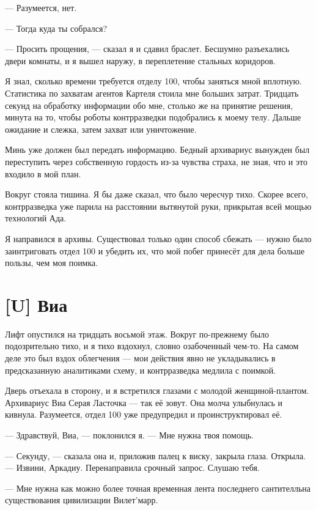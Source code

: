 --- Разумеется, нет.

--- Тогда куда ты собрался?

--- Просить прощения, --- сказал я и сдавил браслет.
Бесшумно разъехались двери комнаты, и я вышел наружу, в переплетение стальных коридоров.

\asterism

Я знал, сколько времени требуется отделу 100, чтобы заняться мной вплотную.
Статистика по захватам агентов Картеля стоила мне больших затрат.
Тридцать секунд на обработку информации обо мне, столько же на принятие решения, минута на то, чтобы роботы контрразведки подобрались к моему телу.
Дальше ожидание и слежка, затем захват или уничтожение.

Минь уже должен был передать информацию.
Бедный архивариус вынужден был переступить через собственную гордость из-за чувства страха, не зная, что и это входило в мой план.

Вокруг стояла тишина.
Я бы даже сказал, что было чересчур тихо.
Скорее всего, контрразведка уже парила на расстоянии вытянутой руки, прикрытая всей мощью технологий Ада.

Я направился в архивы.
Существовал только один способ сбежать --- нужно было заинтриговать отдел 100 и убедить их, что мой побег принесёт для дела больше пользы, чем моя поимка.


\section{[U] Виа}

Лифт опустился на тридцать восьмой этаж.
Вокруг по-прежнему было подозрительно тихо, и я тихо вздохнул, словно озабоченный чем-то.
На самом деле это был вздох облегчения --- мои действия явно не укладывались в предсказанную аналитиками схему, и контрразведка медлила с поимкой.

Дверь отъехала в сторону, и я встретился глазами с молодой женщиной-плантом.
Архивариус Виа Серая Ласточка --- так её зовут.
Она молча улыбнулась и кивнула.
Разумеется, отдел 100 уже предупредил и проинструктировал её.

--- Здравствуй, Виа, --- поклонился я.
--- Мне нужна твоя помощь.

--- Секунду, --- сказала она и, приложив палец к виску, закрыла глаза.
Открыла.
--- Извини, Аркадиу.
Перенаправила срочный запрос.
Слушаю тебя.

--- Мне нужна как можно более точная временная лента последнего сантителльна существования цивилизации Вилет'марр.

